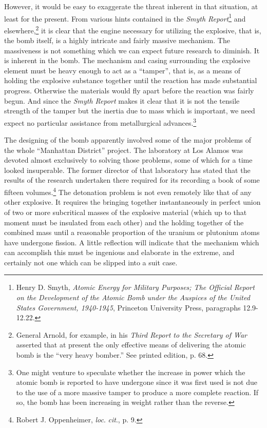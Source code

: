 However, it would be easy to exaggerate the threat inherent in that situation, at least for the present. From various hints contained in the \emph{Smyth Report}\footnote{Henry D. Smyth, \textit{Atomic Energy for Military Purposes; The Official Report on the Development of the Atomic Bomb under the Auspices of the United States Government, 1940-1945}, Princeton University Press, paragraphs 12.9-12.22.} and elsewhere,\footnote{General Arnold, for example, in his \textit{Third Report to the Secretary of War} asserted that at present the only effective means of delivering the atomic bomb is the ``very heavy bomber.'' See printed edition, p. 68.} it is clear that the engine necessary for utilizing the explosive, that is, the bomb itself, is a highly intricate and fairly massive mechanism. The massiveness is not something which we can expect future research to diminish. It is inherent in the bomb. The mechanism and casing surrounding the explosive element must be heavy enough to act as a ``tamper'', that is, as a means of holding the explosive substance together until the reaction has made substantial progress. Otherwise the materials would fly apart before the reaction was fairly begun. And since the \emph{Smyth Report} makes it clear that it is not the tensile strength of the tamper but the inertia due to mass which is important, we need expect no particular assistance from metallurgical advances.\footnote{One might venture to speculate whether the increase in power which the atomic bomb is reported to have undergone since it was first used is not due to the use of a more massive tamper to produce a more complete reaction. If so, the bomb has been increasing in weight rather than the reverse.}

The designing of the bomb apparently involved some of the major problems of the whole ``Manhattan District'' project. The laboratory at Los Alamos was devoted almost exclusively to solving those problems, some of which for a time looked insuperable. The former director of that laboratory has stated that the results of the research undertaken there required for its recording a book of some fifteen volumes.\footnote{Robert J. Oppenheimer, \emph{loc}. \emph{cit}., p. 9.} The detonation problem is not even remotely like that of any other explosive. It requires the bringing together instantaneously in perfect union of two or more subcritical masses of the explosive material (which up to that moment must be insulated from each other) and the holding together of the combined mass until a reasonable proportion of the uranium or plutonium atoms have undergone fission. A little reflection will indicate that the mechanism which can accomplish this must be ingenious and elaborate in the extreme, and certainly not one which can be slipped into a suit case.

